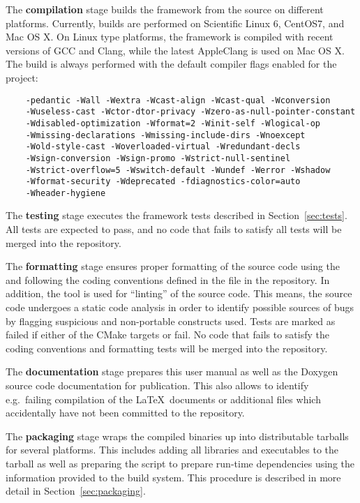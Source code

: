 The \textbf{compilation} stage builds the framework from the source on different platforms.
Currently, builds are performed on Scientific Linux 6, CentOS7, and Mac OS X.
On Linux type platforms, the framework is compiled with recent versions of GCC and Clang, while the latest AppleClang is used on Mac OS X.
The build is always performed with the default compiler flags enabled for the project:
\begin{verbatim}
    -pedantic -Wall -Wextra -Wcast-align -Wcast-qual -Wconversion
    -Wuseless-cast -Wctor-dtor-privacy -Wzero-as-null-pointer-constant
    -Wdisabled-optimization -Wformat=2 -Winit-self -Wlogical-op
    -Wmissing-declarations -Wmissing-include-dirs -Wnoexcept
    -Wold-style-cast -Woverloaded-virtual -Wredundant-decls
    -Wsign-conversion -Wsign-promo -Wstrict-null-sentinel
    -Wstrict-overflow=5 -Wswitch-default -Wundef -Werror -Wshadow
    -Wformat-security -Wdeprecated -fdiagnostics-color=auto
    -Wheader-hygiene
\end{verbatim}

The \textbf{testing} stage executes the framework tests described in Section~\ref{sec:tests}.
All tests are expected to pass, and no code that fails to satisfy all tests will be merged into the repository.

The \textbf{formatting} stage ensures proper formatting of the source code using the  and following the coding conventions defined in the  file in the repository.
In addition, the  tool is used for ``linting'' of the source code.
This means, the source code undergoes a static code analysis in order to identify possible sources of bugs by flagging suspicious and non-portable constructs used.
Tests are marked as failed if either of the CMake targets  or  fail.
No code that fails to satisfy the coding conventions and formatting tests will be merged into the repository.

The \textbf{documentation} stage prepares this user manual as well as the Doxygen source code documentation for publication.
This also allows to identify e.g.\ failing compilation of the \LaTeX~documents or additional files which accidentally have not been committed to the repository.

The \textbf{packaging} stage wraps the compiled binaries up into distributable tarballs for several platforms.
This includes adding all libraries and executables to the tarball as well as preparing the  script to prepare run-time dependencies using the information provided to the build system.
This procedure is described in more detail in Section~\ref{sec:packaging}.


